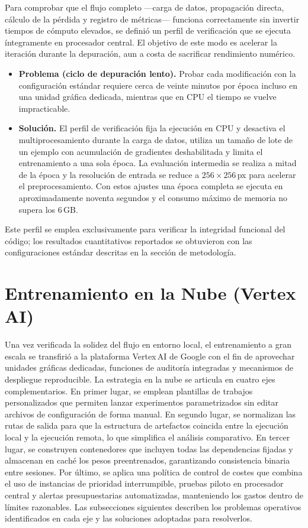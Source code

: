 Para comprobar que el flujo completo —carga de datos, propagación directa, cálculo de la pérdida y registro de métricas— funciona correctamente sin invertir tiempos de cómputo elevados, se definió un perfil de verificación que se ejecuta íntegramente en procesador central.
El objetivo de este modo es acelerar la iteración durante la depuración, aun a costa de sacrificar rendimiento numérico.

\begin{itemize}
  \item \textbf{Problema (ciclo de depuración lento).}
        Probar cada modificación con la configuración estándar requiere cerca de veinte minutos por época incluso en una unidad gráfica dedicada, mientras que en CPU el tiempo se vuelve impracticable.

  \item \textbf{Solución.}
        El perfil de verificación fija la ejecución en CPU y desactiva el multiprocesamiento durante la carga de datos, utiliza un tamaño de lote de un ejemplo con acumulación de gradientes deshabilitada y limita el entrenamiento a una sola época.
        La evaluación intermedia se realiza a mitad de la época y la resolución de entrada se reduce a \(256\times256\)\,px para acelerar el preprocesamiento.
        Con estos ajustes una época completa se ejecuta en aproximadamente noventa segundos y el consumo máximo de memoria no supera los 6\,GB.
\end{itemize}

Este perfil se emplea exclusivamente para verificar la integridad funcional del código; los resultados cuantitativos reportados se obtuvieron con las configuraciones estándar descritas en la sección de metodología.

\section{Entrenamiento en la Nube (Vertex\,AI)}\label{sec:vertex_ai}

Una vez verificada la solidez del flujo en entorno local, el entrenamiento a gran escala se transfirió a la plataforma Vertex\,AI de Google con el fin de aprovechar unidades gráficas dedicadas, funciones de auditoría integradas y mecanismos de despliegue reproducible.
La estrategia en la nube se articula en cuatro ejes complementarios.
En primer lugar, se emplean plantillas de trabajos personalizados que permiten lanzar experimentos parametrizados sin editar archivos de configuración de forma manual.
En segundo lugar, se normalizan las rutas de salida para que la estructura de artefactos coincida entre la ejecución local y la ejecución remota, lo que simplifica el análisis comparativo.
En tercer lugar, se construyen contenedores que incluyen todas las dependencias fijadas y almacenan en caché los pesos preentrenados, garantizando consistencia binaria entre sesiones.
Por último, se aplica una política de control de costes que combina el uso de instancias de prioridad interrumpible, pruebas piloto en procesador central y alertas presupuestarias automatizadas, manteniendo los gastos dentro de límites razonables.
Las subsecciones siguientes describen los problemas operativos identificados en cada eje y las soluciones adoptadas para resolverlos.

